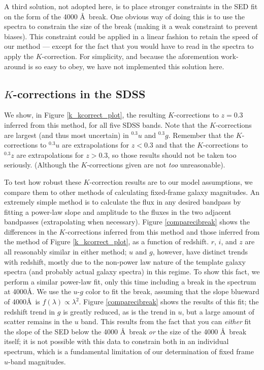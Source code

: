 \documentclass[10pt,preprint]{aastex}
\newcommand{\band}[2]{\ensuremath{^{#1}{#2}}}
\begin{document}
A third solution, not adopted here, is to place stronger constraints
in the SED fit on the form of the 4000 \AA\ break. One obvious way of
doing this is to use the spectra to constrain the size of the break
(making it a weak constraint to prevent biases). This constraint could
be applied in a linear fashion to retain the speed of our method ---
except for the fact that you would have to read in the spectra to
apply the $K$-correction. For simplicity, and because the aforemention
work-around is so easy to obey, we have not implemented this solution
here.

\subsection{$K$-corrections in the SDSS}

We show, in Figure \ref{k_kcorrect_plot}, the resulting $K$-corrections to
$z=0.3$ inferred from this method, for all five SDSS bands. Note that
the $K$-corrections are largest (and thus most uncertain) in
$\band{0.3}{u}$ and $\band{0.3}{g}$. Remember that the $K$-corrections
to $\band{0.3}{u}$ are extrapolations for $z<0.3$ and that the
$K$-corrections to $\band{0.3}{z}$ are extrapolations for $z>0.3$, so
those results should not be taken too seriously. (Although the
$K$-corrections given are not {\it too} unreasonable).

To test how robust these $K$-correction results are to our model
assumptions, we compare them to other methods of calculating
fixed-frame galaxy magnitudes.  An extremely simple method is to
calculate the flux in any desired bandpass by fitting a power-law
slope and amplitude to the fluxes in the two adjacent bandpasses
(extrapolating when necessary). Figure \ref{comparecibreak}
shows the differences in the $K$-corrections inferred from this method
and those inferred from the method of Figure
\ref{k_kcorrect_plot}, as a function of redshift. $r$, $i$, and
$z$ are all reasonably similar in either method; $u$ and $g$, however,
have distinct trends with redshift, mostly due to the non-power law
nature of the template galaxy spectra (and probably actual galaxy
spectra) in this regime. To show this fact, we perform a similar
power-law fit, only this time including a break in the spectrum at
4000\AA. We use the $u$-$g$ color to fit the break, assuming that the
slope blueward of 4000\AA\ is $f(\lambda)\propto \lambda^{2}$.  Figure
\ref{comparecibreak} shows the results of this fit; the
redshift trend in $g$ is greatly reduced, as is the trend in $u$, but
a large amount of scatter remains in the $u$ band. This results from
the fact that you can {\it either} fit the slope of the SED below the
4000 \AA\ break {\it or} the size of the 4000 \AA\ break itself; it is
not possible with this data to constrain both in an individual
spectrum, which is a fundamental limitation of our determination of 
fixed frame $u$-band magnitudes.
\end{document}
